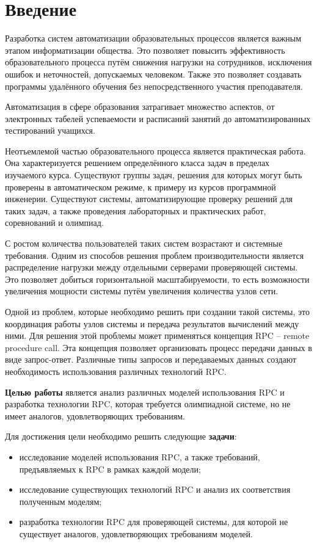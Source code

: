 \chapter*{Введение}
Разработка систем автоматизации образовательных процессов является важным этапом
информатизации общества. Это позволяет повысить эффективность образовательного
процесса путём снижения нагрузки на сотрудников, исключения ошибок и
неточностей, допускаемых человеком. Также это позволяет создавать программы
удалённого обучения без непосредственного участия преподавателя.

Автоматизация в сфере образования затрагивает множество аспектов,
от электронных табелей успеваемости и расписаний занятий до автоматизированных
тестирований учащихся.

Неотъемлемой частью образовательного процесса является практическая работа.
Она характеризуется решением определённого класса задач в пределах изучаемого
курса. Существуют группы задач, решения для которых могут быть проверены
в автоматическом режиме, к примеру из курсов программной инженерии.
Существуют системы, автоматизирующие проверку решений для таких задач,
а также проведения лабораторных и практических работ, соревнований и олимпиад.

С ростом количества пользователей таких систем возрастают и системные требования.
Одним из способов решения проблем производительности является
распределение нагрузки между отдельными серверами проверяющей системы.
Это позволяет добиться горизонтальной масштабируемости, то есть возможности
увеличения мощности системы путём увеличения количества узлов сети.

Одной из проблем, которые необходимо решить при создании такой системы,
это координация работы узлов системы и передача результатов вычислений
между ними. Для решения этой проблемы может применяться концепция RPC --
remote procedure call. Эта концепция позволяет организовать процесс передачи
данных в виде запрос-ответ. Различные типы запросов и передаваемых данных
создают необходимость использования различных технологий RPC.

\textbf{Целью работы} является анализ различных моделей использования RPC
и разработка технологии RPC, которая требуется олимпиадной системе, но не имеет
аналогов, удовлетворяющих требованиям.

Для достижения цели необходимо решить следующие \textbf{задачи}:
\begin{itemize}
    \item исследование моделей использования RPC, а также требований,
        предъявляемых к RPC в рамках каждой модели;
    \item исследование существующих технологий RPC и анализ их соответствия
        полученным моделям;
    \item разработка технологии RPC для проверяющей системы, для которой
        не существует аналогов, удовлетворяющих требованиям моделей.
\end{itemize}

